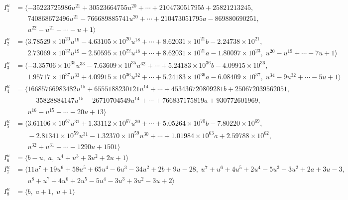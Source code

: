 \documentclass[1p]{elsarticle_modified}
\theoremstyle{definition}
\begin{document}
\begin{align*}
I^u_{1}&=\langle 
-35223725986 u^{21}+30523664755 u^{20}+\cdots+210473051795 b+25821213245,\\
\phantom{I^u_{1}}&\phantom{= \langle  }740868672496 u^{21}-766689885741 u^{20}+\cdots+210473051795 a-869880690251,\\
\phantom{I^u_{1}}&\phantom{= \langle  }u^{22}- u^{21}+\cdots- u+1\rangle \\
I^u_{2}&=\langle 
3.78529\times10^{20} u^{19}-4.63105\times10^{20} u^{18}+\cdots+8.62031\times10^{21} b-2.24738\times10^{21},\\
\phantom{I^u_{2}}&\phantom{= \langle  }2.73069\times10^{22} u^{19}-2.50595\times10^{22} u^{18}+\cdots+8.62031\times10^{21} a-1.80097\times10^{23},\;u^{20}- u^{19}+\cdots-7 u+1\rangle \\
I^u_{3}&=\langle 
-3.35706\times10^{35} u^{33}-7.63609\times10^{35} u^{32}+\cdots+5.24183\times10^{36} b-4.09915\times10^{36},\\
\phantom{I^u_{3}}&\phantom{= \langle  }1.95717\times10^{37} u^{33}+4.09915\times10^{36} u^{32}+\cdots+5.24183\times10^{36} a-6.08409\times10^{37},\;u^{34}-9 u^{32}+\cdots-5 u+1\rangle \\
I^u_{4}&=\langle 
16685766983482 u^{15}+6555188230121 u^{14}+\cdots+453436720809281 b+250672039562051,\\
\phantom{I^u_{4}}&\phantom{= \langle  }-35828884147 u^{15}-26710704549 u^{14}+\cdots+766837175819 a+930772601969,\\
\phantom{I^u_{4}}&\phantom{= \langle  }u^{16}- u^{15}+\cdots-20 u+13\rangle \\
I^u_{5}&=\langle 
3.61106\times10^{67} u^{31}+1.33112\times10^{67} u^{30}+\cdots+5.05264\times10^{70} b-7.80220\times10^{69},\\
\phantom{I^u_{5}}&\phantom{= \langle  }-2.81341\times10^{59} u^{31}-1.32370\times10^{59} u^{30}+\cdots+1.01984\times10^{63} a+2.59788\times10^{62},\\
\phantom{I^u_{5}}&\phantom{= \langle  }u^{32}+u^{31}+\cdots-1290 u+1501\rangle \\
I^u_{6}&=\langle 
b- u,\;a,\;u^4+u^3+3 u^2+2 u+1\rangle \\
I^u_{7}&=\langle 
11 u^7+19 u^6+58 u^5+65 u^4-6 u^3-34 u^2+2 b+9 u-28,\;u^7+u^6+4 u^5+2 u^4-5 u^3-3 u^2+2 a+3 u-3,\\
\phantom{I^u_{7}}&\phantom{= \langle  }u^8+u^7+4 u^6+2 u^5-5 u^4-3 u^3+3 u^2-3 u+2\rangle \\
I^u_{8}&=\langle 
b,\;a+1,\;u+1\rangle \\
\\
\end{align*}
\end{document}
